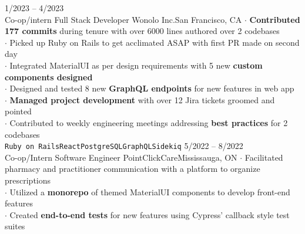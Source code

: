 \documentclass[9pt]{developercv} %
\begin{document}


\begin{minipage}[t]{\textwidth}
	\vspace{-\baselineskip} %

	\begin{entrylist}
		\entry
			{1/2023 -- 4/2023\\\footnotesize{Co-op/intern}}
			{Full Stack Developer}
			{Wonolo Inc.\slashsep San Francisco, CA}
			{
				$\cdot$ \textbf{Contributed 177 commits} during tenure with over 6000 lines authored over 2 codebases\\
				$\cdot$ Picked up Ruby on Rails to get acclimated ASAP with first PR made on second day\\
				$\cdot$ Integrated MaterialUI as per design requirements with 5 new \textbf{custom components designed}\\
				$\cdot$ Designed and tested 8 new \textbf{GraphQL endpoints} for new features in web app\\
				$\cdot$ \textbf{Managed project development} with over 12 Jira tickets groomed and pointed\\
				$\cdot$ Contributed to weekly engineering meetings addressing \textbf{best practices} for 2 codebases\\
				\texttt{Ruby on Rails}\slashsep\texttt{React}\slashsep\texttt{PostgreSQL}\slashsep\texttt{GraphQL}\slashsep\texttt{Sidekiq}
			}
		\entry
			{5/2022 -- 8/2022\\\footnotesize{Co-op/Intern}}
			{Software Engineer}
			{PointClickCare\slashsep Mississauga, ON}
			{
				$\cdot$ Facilitated pharmacy and practitioner communication with a platform to organize prescriptions\\
				$\cdot$ Utilized a \textbf{monorepo} of themed MaterialUI components to develop front-end features\\
				$\cdot$ Created \textbf{end-to-end tests} for new features using Cypress' callback style test suites\\
}
\end{entrylist}
\end{minipage}
\end{document}
